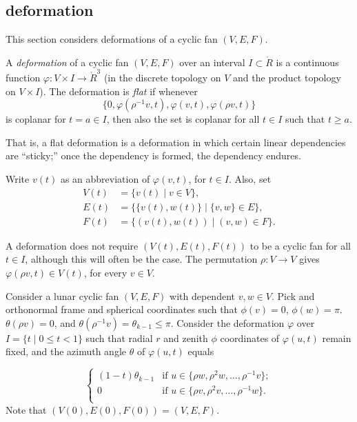 \subsection{deformation}\label{sec:deformation}

This section considers deformations of a cyclic fan $(V,E,F)$.

\begin{definition}
A {\it deformation} of a cyclic fan $(V,E,F)$ over an interval $I\subset\ring{R}$
is a 
continuous function $\varphi:V\times I \to\ring{R}^3$ (in the discrete topology on $V$ and the product topology on $V\times I$).
The deformation is {\it flat} if whenever
$$\{0,\varphi(\rho^{-1}v,t),\varphi(v,t),\varphi(\rho v,t)\}$$
is coplanar for $t=a\in I$, then also the set is coplanar for all $t\in I$ such
that $t\ge a$.
\end{definition}
%
%
%

That is, a flat deformation is a deformation in which certain linear
dependencies are ``sticky;''  once the dependency is formed, the dependency endures.

Write $v(t)$ as an abbreviation of $\varphi(v,t)$, for $t\in I$.  
Also, set
$$
\begin{array}{lll}
V(t)&=\{v(t) \mid v\in V\},\\
E(t)&=\{\{v(t),w(t)\}\mid \{v,w\}\in E\},\\
F(t)&= \{(v(t),w(t)) \mid  (v,w)\in F\}.
\end{array}
$$


A deformation does not require $(V(t),E(t),F(t))$ to be a cyclic fan for all $t\in I$, although this will often be the case. The permutation $\rho:V\to V$ gives $\varphi(\rho v,t)\in V(t)$, for every $v\in V$.  


\begin{example}
Consider a lunar cyclic fan $(V,E,F)$ with dependent $v,w\in V$.   Pick and orthonormal frame and spherical coordinates such that $\phi(v)=0$, $\phi(w)=\pi$.  $\theta(\rho v)=0$, and $\theta(\rho^{-1} v)=\theta_{k-1}\le\pi$.  Consider the deformation $\varphi$ over 
$I = \{t \mid 0 \le t < 1\}$
such that radial $r$ and zenith $\phi$ coordinates of $\varphi(u,t)$ remain fixed,
and the azimuth angle $\theta$ of $\varphi(u,t)$ equals

$$
\begin{cases} 
   (1-t) \theta_{k-1} & \text{if } u\in \{\rho w,\rho^2 w,\ldots, \rho^{-1} v\};\\
   0 & \text{if } u\in \{\rho v,\rho^2 v,\ldots,\rho^{-1} w\}.\\
\end{cases}
$$
Note that $(V(0),E(0),F(0)) = (V,E,F)$.
\end{example}
%
%

